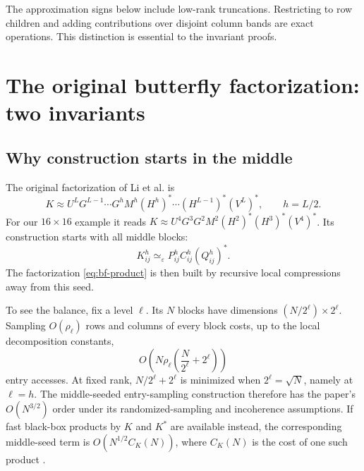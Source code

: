 \documentclass[11pt]{article}
\newcommand{\e}{\varepsilon}
\newcommand{\simeqeps}{\simeq_{\e}}
\begin{document}
The approximation signs below include low-rank truncations.  Restricting to row children and adding contributions over disjoint column bands are exact operations.  This distinction is essential to the invariant proofs.

\section{The original butterfly factorization: two invariants}
\label{sec:original}

\subsection{Why construction starts in the middle}
\label{sec:why-middle}

The original factorization of Li et al. \cite{BF} is
\[
 K\approx U^L G^{L-1}\cdots G^h M^h(H^h)^*\cdots(H^{L-1})^*(V^L)^*,
 \qquad h=L/2 .
 \tag{3}\label{eq:bf-product}
\]
For our $16\times16$ example it reads $K\approx U^4G^3G^2M^2(H^2)^*(H^3)^*(V^4)^*$.  Its construction starts with all middle blocks:
\[
 K_{ij}^{h}\simeqeps P_{ij}^{h}C_{ij}^{h}(Q_{ij}^{h})^* .
 \tag{4}\label{eq:middle-seed}
\]
The factorization \eqref{eq:bf-product} is then built by recursive local compressions away from this seed.

\begin{center}
\end{center}

To see the balance, fix a level $\ell$.  Its $N$ blocks have dimensions $(N/2^\ell)\times2^\ell$.  Sampling $O(\rho_\ell)$ rows and columns of every block costs, up to the local decomposition constants,
\[
 O\!\left(N\rho_\ell\left(\frac{N}{2^\ell}+2^\ell\right)\right)
 \tag{5}\label{eq:sampling-cost}
\]
entry accesses.  At fixed rank, $N/2^\ell+2^\ell$ is minimized when $2^\ell=\sqrt N$, namely at $\ell=h$.  The middle-seeded entry-sampling construction therefore has the paper's $O(N^{3/2})$ order under its randomized-sampling and incoherence assumptions.  If fast black-box products by $K$ and $K^*$ are available instead, the corresponding middle-seed term is $O(N^{1/2}C_K(N))$, where $C_K(N)$ is the cost of one such product \cite{BF}.
\end{document}
